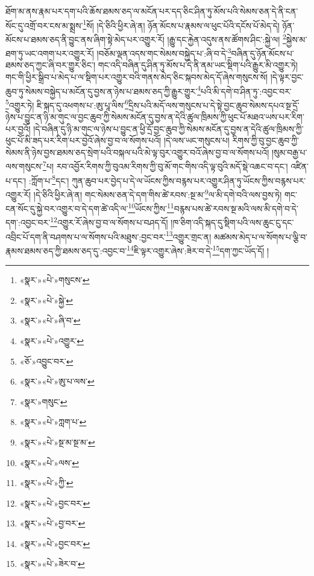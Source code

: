 ཐོག་མ་ནས་རྣམ་པར་དག་པའི་ཆོས་ཐམས་ཅད་ལ་མངོན་པར་དད་ཅིང་ཤིན་ཏུ་མོས་པའི་སེམས་ཅན་དེ་ནི་ངན་སོང་དུ་འགྲོ་བར་ངས་མ་སྨྲས་\footnote{«སྣར་»«པེ་»གསུངས་}སོ། །དེ་ཅིའི་ཕྱིར་ཞེ་ན། ཉོན་མོངས་པ་རྣམས་ལ་ཕུང་པོའི་དངོས་པོ་མེད་དེ། ཉོན་མོངས་པ་ཐམས་ཅད་ནི་བྱུང་ནས་ཞིག་སྟེ་མེད་པར་འགྱུར་རོ། །རྒྱུ་དང་རྐྱེན་འདུས་ནས་ཚོགས་ཤིང་:སྐྱེ་ལ། \footnote{«སྣར་»«པེ་»སྐྱེ་}སྐྱེས་མ་ཐག་ཏུ་ཡང་འགག་པར་འགྱུར་རོ། །བཅོམ་ལྡན་འདས་གང་སེམས་བསྐྱེད་པ་:ཞི་བ་དེ་\footnote{«སྣར་»«པེ་»ཞི་བ་}བཞིན་དུ་ཉོན་མོངས་པ་ཐམས་ཅད་ཀྱང་ཞི་བར་གྱུར་ཅིང་། གང་འདི་བཞིན་དུ་ཤིན་ཏུ་མོས་པ་དེ་ནི་ནམ་ཡང་སྡིག་པའི་རྒྱུར་མི་འགྱུར་ཏེ། གང་གི་ཕྱིར་སྒྲིབ་པ་མེད་པ་ལ་སྡིག་པར་འགྱུར་བའི་གནས་མེད་ཅིང་སྐབས་མེད་དོ་ཞེས་གསུངས་སོ། །དེ་ལྟར་བྱང་ཆུབ་ཏུ་སེམས་བསྐྱེད་པ་མངོན་དུ་བྱས་ན་ཉེས་པ་ཐམས་ཅད་ཀྱི་རྒྱུར་གྱུར་\footnote{«སྣར་»«པེ་»འགྱུར་}པའི་མི་དགེ་བ་ཤིན་ཏུ་:འབྱང་བར་\footnote{«ཅོ་»འབྱུང་བར་}འགྱུར་ཏེ། ཇི་སྐད་དུ་འཕགས་པ་:ཨུ་པཱ་ལིས་\footnote{«སྣར་»«པེ་»ཨུ་པ་ལས་}དྲིས་པའི་མདོ་ལས་གསུངས་པ་དེ་སྟེ་བྱང་ཆུབ་སེམས་དཔའ་སྔ་དྲོ་ཉེས་པ་བྱུང་ན་ཉི་མ་གུང་ལ་བྱང་ཆུབ་ཀྱི་སེམས་མངོན་དུ་བྱས་ན་དེའི་ཚུལ་ཁྲིམས་ཀྱི་ཕུང་པོ་མཐའ་ཡས་པར་རིག་པར་བྱའོ། །དེ་བཞིན་དུ་ཉི་མ་གུང་ལ་ཉེས་པ་བྱུང་ན་ཕྱི་དྲོ་བྱང་ཆུབ་ཀྱི་སེམས་མངོན་དུ་བྱས་ན་དེའི་ཚུལ་ཁྲིམས་ཀྱི་ཕུང་པོ་མི་ཟད་པར་རིག་པར་བྱའོ་ཞེས་བྱ་བ་ལ་སོགས་པའོ། །དེ་ལས་ཡང་གསུངས་པ། རིགས་ཀྱི་བུ་བྱང་ཆུབ་ཀྱི་སེམས་ནི་ཉེས་བྱས་ཐམས་ཅད་སྲེག་པའི་བསྐལ་པའི་མེ་ལྟ་བུར་འགྱུར་བའོ་ཞེས་བྱ་བ་ལ་སོགས་པའོ། །སུམ་བརྒྱ་པ་ལས་གསུངས་\footnote{«སྣར་»གསུང་}པ། རབ་འབྱོར་རིགས་ཀྱི་བུའམ་རིགས་ཀྱི་བུ་མོ་གང་གིས་འདི་ལྟ་བུའི་མདོ་སྡེ་འཆང་བ་དང་། འཛིན་པ་དང་། :ཀློག་པ་\footnote{«སྣར་»«པེ་»ཀླག་པ་}དང་། ཀུན་ཆུབ་པར་བྱེད་པ་དེ་ལ་ཡོངས་ཀྱིས་བརྙས་པར་འགྱུར་ཤིན་ཏུ་ཡོངས་ཀྱིས་བརྙས་པར་འགྱུར་རོ། །དེ་ཅིའི་ཕྱིར་ཞེ་ན། གང་སེམས་ཅན་དེ་དག་གིས་ཚེ་རབས་:སྔ་མ་\footnote{«སྣར་»«པེ་»སྔ་མ་སྔ་མ་}ལ་མི་དགེ་བའི་ལས་བྱས་ཏེ། གང་ངན་སོང་དུ་སྐྱེ་བར་འགྱུར་བ་དེ་དག་ཚེ་འདི་ལ་\footnote{«སྣར་»«པེ་»ལས་}ཡོངས་ཀྱིས་\footnote{«སྣར་»«པེ་»ཀྱི་}བརྙས་པས་ཚེ་རབས་སྔ་མའི་ལས་མི་དགེ་བ་དེ་དག་:འབྱང་བར་\footnote{«སྣར་»«པེ་»བྱང་བར་}འགྱུར་རོ་ཞེས་བྱ་བ་ལ་སོགས་པ་བཤད་དོ། །ཁ་ཅིག་འདི་སྐད་དུ་སྡིག་པའི་ལས་ཆུང་ངུ་དང་འབྲིང་པོ་དག་ནི་བཤགས་པ་ལ་སོགས་པའི་མཐུས་:བྱང་བར་\footnote{«སྣར་»«པེ་»བྱ་བར་}འགྱུར་གྲང་ན། མཚམས་མེད་པ་ལ་སོགས་པ་ལྕི་བ་རྣམས་ཐམས་ཅད་ཀྱི་ཐམས་ཅད་དུ་:འབྱང་བ་\footnote{«སྣར་»«པེ་»བྱང་བར་}ཇི་ལྟར་འགྱུར་ཞེས་:ཟེར་བ་དེ་\footnote{«སྣར་»«པེ་»ཟེར་བ་}དག་ཀྱང་ཡོད་དོ། །

